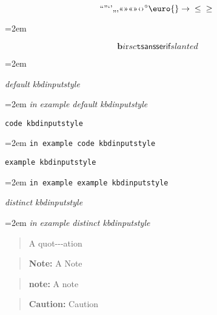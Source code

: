 \documentclass{book}
\begin{document}
\endgroup{}%
$$
\mathord{\text{\textquotedblleft{}}} \mathord{\text{\textquotedblright{}}} 
\mathord{\text{\textquoteleft{}}} \mathord{\text{\textquoteright{}}} \mathord{\text{\quotedblbase{}}} \mathord{\text{\quotesinglbase{}}} \mathord{\text{\guillemotleft{}}}
\mathord{\text{\guillemotright{}}} \mathord{\text{\guillemotleft{}}} \mathord{\text{\guillemotright{}}} \mathord{\text{\guilsinglleft{}}}
\mathord{\text{\guilsinglright{}}} ^{\circ{}} \euro{} \rightarrow{} \leq{} \geq{}
$$
\par\begingroup\obeylines\obeyspaces\frenchspacing\leftskip=2em\relax\parskip=0pt\relax\ttfamily{}%

\endgroup{}%
$$
\mathbf{b} \mathit{i} \mathrm{r} sc \mathtt{t} \mathsf{sansserif} slanted
$$
\par\begingroup\obeylines\obeyspaces\frenchspacing\leftskip=2em\relax\parskip=0pt\relax\ttfamily{}%

{\ttfamily\textsl{default kbdinputstyle}}
\par\begingroup\obeylines\obeyspaces\frenchspacing\leftskip=2em\relax\parskip=0pt\relax\ttfamily{}%
{\ttfamily\textsl{in example default kbdinputstyle}}
\endgroup{}%

\texttt{code kbdinputstyle}
\par\begingroup\obeylines\obeyspaces\frenchspacing\leftskip=2em\relax\parskip=0pt\relax\ttfamily{}%
\texttt{in example code kbdinputstyle}
\endgroup{}%

\texttt{example kbdinputstyle}
\par\begingroup\obeylines\obeyspaces\frenchspacing\leftskip=2em\relax\parskip=0pt\relax\ttfamily{}%
\texttt{in example example kbdinputstyle}
\endgroup{}%

{\ttfamily\textsl{distinct kbdinputstyle}}
\par\begingroup\obeylines\obeyspaces\frenchspacing\leftskip=2em\relax\parskip=0pt\relax\ttfamily{}%
{\ttfamily\textsl{in example distinct kbdinputstyle}}
\endgroup{}%

\begin{quote}
A quot{-}{-}{-}ation
\end{quote}

\begin{quote}
\textbf{Note:} A Note
\end{quote}

\begin{quote}
\textbf{note:} A note
\end{quote}

\begin{quote}
\textbf{Caution:} Caution
\end{quote}
\end{document}
